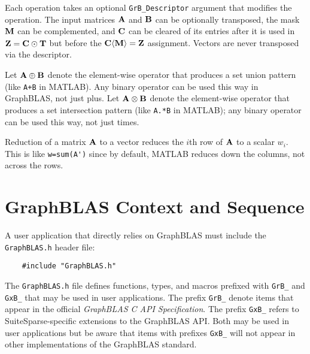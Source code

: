 \documentclass[12pt]{article}
\begin{document}
\vspace{0.05in}

Each operation takes an optional \verb'GrB_Descriptor' argument that modifies
the operation.  The input matrices ${\bf A}$ and ${\bf B}$ can be optionally
transposed, the mask ${\bf M}$ can be complemented, and ${\bf C}$ can be
cleared of its entries after it is used in ${\bf Z = C \odot T}$ but before
the ${\bf C \langle M \rangle = Z}$ assignment.
Vectors are never transposed via the descriptor.

Let ${\bf A \oplus B}$ denote the element-wise operator that produces a set
union pattern (like \verb'A+B' in MATLAB).  Any binary operator can be used
this way in GraphBLAS, not just plus.  Let ${\bf A \otimes B}$ denote the
element-wise operator that produces a set intersection pattern (like
\verb'A.*B' in MATLAB); any binary operator can be used this way, not just
times.

Reduction of a matrix ${\bf A}$ to a vector reduces the $i$th row of ${\bf A}$
to a scalar $w_i$.  This is like \verb"w=sum(A')" since by default, MATLAB
reduces down the columns, not across the rows.




\newpage
\section{GraphBLAS Context and Sequence} %
\label{context}

A user application that directly relies on GraphBLAS must include the
\verb'GraphBLAS.h' header file:

\begin{mdframed}[userdefinedwidth=6in]
{\footnotesize
\begin{verbatim}
    #include "GraphBLAS.h"
\end{verbatim}
} \end{mdframed}

The \verb'GraphBLAS.h' file defines functions, types, and macros prefixed with
\verb'GrB_' and \verb'GxB_' that may be used in user applications.  The prefix
\verb'GrB_' denote items that appear in the official {\em GraphBLAS C API
Specification}.  The prefix \verb'GxB_' refers to SuiteSparse-specific
extensions to the GraphBLAS API.  Both may be used in user applications but be
aware that items with prefixes \verb'GxB_' will not appear in other
implementations of the GraphBLAS standard.
\end{document}
